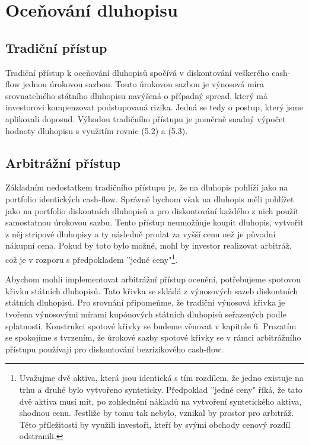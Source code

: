 \documentclass[a4paper]{book}
\begin{document}
\section{Oceňování dluhopisu}

\subsection{Tradiční přístup}

Tradiční přístup k oceňování dluhopisů spočívá v diskontování veškerého cash-flow jednou úrokovou sazbou. Touto úrokovou sazbou je výnosová míra srovnatelného státního dluhopisu navýšená o případný spread, který má investorovi kompenzovat podstupovaná rizika. Jedná se tedy o postup, který jsme aplikovali doposud. Výhodou tradičního přístupu je poměrně snadný výpočet hodnoty dluhopisu s využitím rovnic (5.2) a (5.3).

\subsection{Arbitrážní přístup}

Základním nedostatkem tradičního přístupu je, že na dluhopis pohlíží jako na portfolio identických cash-flow. Správně bychom však na dluhopis měli pohlížet jako na portfolio diskontních dluhopisů a pro diskontování každého z nich použít samostatnou úrokovou sazbu. Tento přístup neumožňuje koupit dluhopis, vytvořit z něj stripové dluhopisy a ty následně prodat za vyšší cenu než je původní nákupní cena. Pokud by toto bylo možné, mohl by investor realizovat arbitráž, což je v rozporu s předpokladem ''jedné ceny"\footnote{Uvažujme dvě aktiva, která jsou identická s tím rozdílem, že jedno existuje na trhu a druhé bylo vytvořeno synteticky. Předpoklad ''jedné ceny" říká, že tato dvě aktiva musí mít, po zohlednění nákladů na vytvoření syntetického aktiva, shodnou cenu. Jestliže by tomu tak nebylo, vznikal by prostor pro arbitráž. Této příležitosti by využili investoři, kteří by svými obchody cenový rozdíl odstranili.}.

Abychom mohli implementovat arbitrážní přístup ocenění, potřebujeme spotovou křivku státních dluhopisů. Tato křivka se skládá z výnosových sazeb diskontních státních dluhopisů. Pro srovnání připomeňme, že tradiční výnosová křivka je tvořena výnosovými mírami kupónových státních dluhopisů seřazených podle splatnosti. Konstrukci spotové křivky se budeme věnovat v kapitole 6. Prozatím se spokojíme s tvrzením, že úrokové sazby spotové křivky se v rámci arbitrážního přístupu používají pro diskontování bezrizikového cash-flow.
\end{document}

